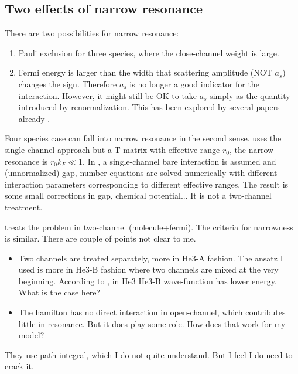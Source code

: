 \subsection{Two effects of narrow resonance}
There are two possibilities for narrow resonance:  
\begin{enumerate}
\item Pauli exclusion for three species, where the close-channel weight is large.  
\item Fermi energy is larger than the width that scattering amplitude (NOT $a_{s}$) changes the sign.  Therefore $a_{s}$ is no longer a good indicator for the interaction.  However, it might still be OK to take $a_{s}$ simply as the quantity introduced by renormalization.   This has been explored by several papers already \cite{NarrowJensen1,NarrowJensen,GurarieNarrow}.  
\end{enumerate}
Four species case can fall into narrow resonance in  the second sense.  \cite{NarrowJensen1,NarrowJensen} uses the single-channel approach but a T-matrix with effective range $r_{0}$, the narrow resonance is $r_{0}k_{F}\ll1$.  In \cite{NarrowJensen}, a single-channel bare interaction is assumed and (unnormalized) gap, number equations  are  solved numerically with different interaction parameters corresponding to different effective ranges. The result is some small corrections in gap, chemical potential...   It is not a two-channel treatment.  

\cite{GurarieNarrow} treats the problem in two-channel (molecule+fermi).  The criteria for narrowness is similar.  There are couple of points not clear to me.   
\begin{itemize}
\item Two channels are treated separately, more in He3-A fashion.  The ansatz I used is more in He3-B fashion where two channels are mixed at the very beginning.   According to \cite{He3B}, in He3 He3-B wave-function has lower energy.  What is the case here?
\item The hamilton has no direct interaction in open-channel, which contributes little in resonance.  But it does play some role.  How does that work for my model?
\end{itemize}
They use path integral, which I do not quite understand.  But I feel I do need to crack it.  

